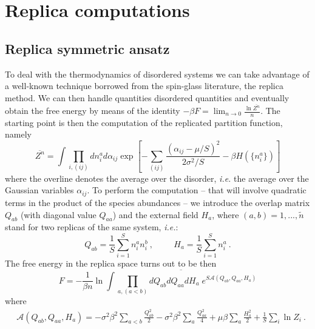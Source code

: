 \documentclass[12pt]{article}
\title{}
\begin{document}
\maketitle



\section{Replica computations}

\subsection{Replica symmetric ansatz}
\label{analysisRS}

To deal with the thermodynamics of disordered systems we can take advantage of a well-known technique borrowed from the spin-glass literature, the replica method.
We can then handle quantities disordered quantities and eventually obtain the free energy by means of the identity $-\beta F=\lim_{n \rightarrow 0} \frac{\ln \overline{{Z^n}}}{n} $.
The starting point is then the computation of the replicated partition function, namely
\begin{equation}
    \overline{Z^n} = \int \prod_{i, (ij)} d n_i^a d \alpha_{ij} \exp \left[-\sum_{(ij)} \frac{(\alpha_{ij} - \mu /S)^2}{2 \sigma^2/S} -\beta H(\lbrace n_i^a \rbrace) \right]
\end{equation}
where the overline denotes the average over the disorder, \emph{i.e.} the average over the Gaussian variables $\alpha_{ij}$. 
To perform the computation -- that will involve quadratic terms in the product of the species abundances -- we introduce the overlap matrix $Q_{ab}$ (with diagonal value $Q_{aa}$) and the external field $H_a$, where $(a, b)=1,...,\tilde{n}$ stand for two replicas of the same system, \emph{i.e.}:
\begin{equation}
Q_{ab}=\frac{1}{S} \sum \limits_{i=1}^{S}  n_i^ a n_i^b \ , \hspace{1cm}
    H_a=\frac{1}{S} \sum \limits_{i=1}^{S}  n_i^a  \ .
\end{equation}
The free energy in the replica space turns out to be then
\begin{equation}
 F= -\frac{1}{\beta n}\ln \overline{\int \prod \limits_{a,(a<b)} d Q_{ab}d Q_{aa} d H_{a} \; e^{S \mathcal{A}(Q_{ab}, Q_{aa},H_a) }}
 \label{freeenergy_RS}
\end{equation}
where
\begin{equation}
\begin{split}
& \mathcal{A}(Q_{ab},Q_{aa},H_a)=  - \sigma^2 \beta^2 \sum \limits_{a<b}\frac{Q_{ab}^2}{2}-\sigma^2 \beta^2 \sum \limits_a \frac{Q_{aa}^2}{4}+ \mu \beta \sum_a \frac{H_a^2}{2}+\frac{1}{S}\sum \limits_i \ln Z_i \ .
\end{split}
\end{equation}
\end{document}
